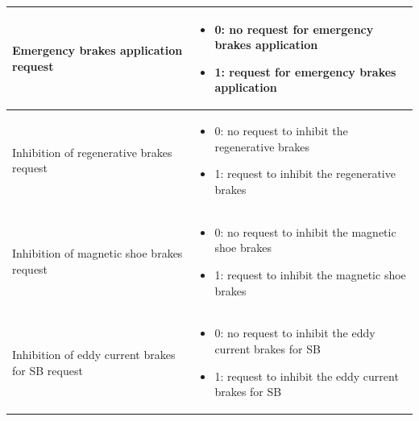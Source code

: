 \documentclass[nocc]{template/openetcs_report}
\begin{document}
\begin{longtable}{|l|l|}
				\begin{minipage}[t]{0.5\linewidth} Emergency brakes application request	\end{minipage} 
				&	\begin{minipage}[t]{0.5\linewidth}
						\begin{itemize}
							\item 0: no request for emergency brakes application
							\item 1: request for emergency brakes application
						\end{itemize}
					\end{minipage} \\
				\hline
				\begin{minipage}[t]{0.5\linewidth} Inhibition of regenerative brakes request	\end{minipage} 
				&	\begin{minipage}[t]{0.5\linewidth}
						\begin{itemize}
							\item 0: no request to inhibit the regenerative brakes
							\item 1: request to inhibit the regenerative brakes
						\end{itemize}
					\end{minipage} \\
				\hline
				\begin{minipage}[t]{0.5\linewidth} Inhibition of magnetic shoe brakes request	\end{minipage} 
				&	\begin{minipage}[t]{0.5\linewidth}
						\begin{itemize}
							\item 0: no request to inhibit the magnetic shoe brakes
							\item 1: request to inhibit the magnetic shoe brakes
						\end{itemize}
					\end{minipage} \\
				\hline
				\begin{minipage}[t]{0.5\linewidth} Inhibition of eddy current brakes for SB request	\end{minipage} 
				&	\begin{minipage}[t]{0.5\linewidth}
						\begin{itemize}
							\item 0: no request to inhibit the eddy current brakes for SB
							\item 1: request to inhibit the eddy current brakes for SB

\end{itemize}
\end{minipage}
\end{longtable}
\end{document}
